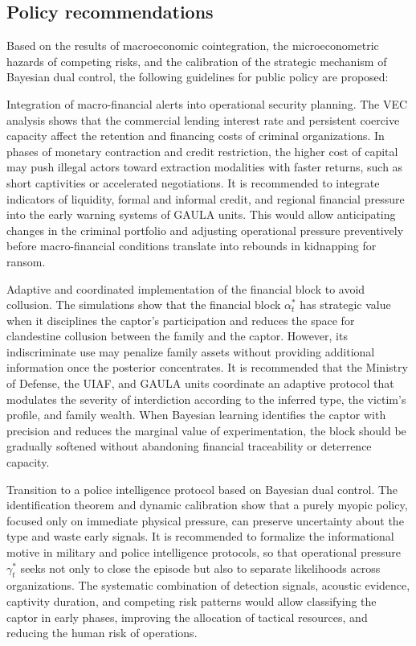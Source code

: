 \documentclass[ecta,nameyear,draft]{econsocart}
\theoremstyle{plain}
\theoremstyle{definition}
\newcommand{\1}{\mathbf{1}}
\begin{document}
\subsection{Policy recommendations}

Based on the results of macroeconomic cointegration, the microeconometric hazards of competing risks, and the calibration of the strategic mechanism of Bayesian dual control, the following guidelines for public policy are proposed:

Integration of macro-financial alerts into operational security planning.\quad
The VEC analysis shows that the commercial lending interest rate and persistent coercive capacity affect the retention and financing costs of criminal organizations. In phases of monetary contraction and credit restriction, the higher cost of capital may push illegal actors toward extraction modalities with faster returns, such as short captivities or accelerated negotiations. It is recommended to integrate indicators of liquidity, formal and informal credit, and regional financial pressure into the early warning systems of GAULA units. This would allow anticipating changes in the criminal portfolio and adjusting operational pressure preventively before macro-financial conditions translate into rebounds in kidnapping for ransom.

Adaptive and coordinated implementation of the financial block to avoid collusion.\quad
The simulations show that the financial block $\alpha_t^\ast$ has strategic value when it disciplines the captor's participation and reduces the space for clandestine collusion between the family and the captor. However, its indiscriminate use may penalize family assets without providing additional information once the posterior concentrates. It is recommended that the Ministry of Defense, the UIAF, and GAULA units coordinate an adaptive protocol that modulates the severity of interdiction according to the inferred type, the victim's profile, and family wealth. When Bayesian learning identifies the captor with precision and reduces the marginal value of experimentation, the block should be gradually softened without abandoning financial traceability or deterrence capacity.

Transition to a police intelligence protocol based on Bayesian dual control.\quad
The identification theorem and dynamic calibration show that a purely myopic policy, focused only on immediate physical pressure, can preserve uncertainty about the type and waste early signals. It is recommended to formalize the informational motive in military and police intelligence protocols, so that operational pressure $\gamma_t^\ast$ seeks not only to close the episode but also to separate likelihoods across organizations. The systematic combination of detection signals, acoustic evidence, captivity duration, and competing risk patterns would allow classifying the captor in early phases, improving the allocation of tactical resources, and reducing the human risk of operations.
\end{document}
